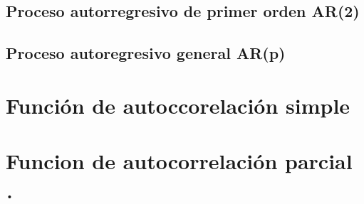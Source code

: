 \documentclass[11pt]{beamer}
\begin{document}
\subsection{Proceso autorregresivo de primer orden AR(2)}
\subsection{Proceso autoregresivo general AR(p)}
\section{Función de autoccorelación simple}
\section{Funcion de autocorrelación parcial}
\begin{frame}{•}

\end{frame}
\end{document}
